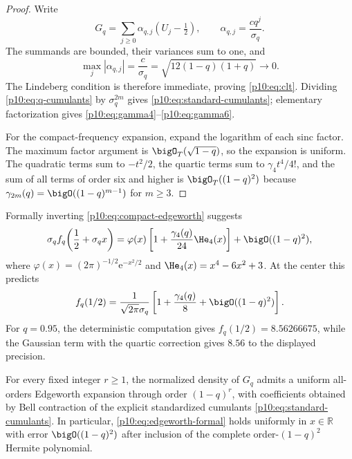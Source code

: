 \documentclass[11pt]{article}
\numberwithin{equation}{section}
\theoremstyle{definition}
\theoremstyle{remark}
\newcommand{\R}{\mathbb R}
\newcommand{\e}{\mathrm e}
\begin{document}
\begin{proof}
Write
\[
 G_q=\sum_{j\ge0}\alpha_{q,j}(U_j-\tfrac12),
 \qquad
 \alpha_{q,j}=\frac{cq^j}{\sigma_q}.
\]
The summands are bounded, their variances sum to one, and
\[
 \max_j|\alpha_{q,j}|=\frac{c}{\sigma_q}
 =\sqrt{12(1-q)(1+q)}\longrightarrow0.
\]
The Lindeberg condition is therefore immediate, proving \eqref{p10:eq:clt}.
Dividing \eqref{p10:eq:q-cumulants} by $\sigma_q^{2m}$ gives
\eqref{p10:eq:standard-cumulants}; elementary factorization gives
\eqref{p10:eq:gamma4}--\eqref{p10:eq:gamma6}.

For the compact-frequency expansion, expand the logarithm of each sinc factor.  The maximum
factor argument is $\bigO_T(\sqrt{1-q})$, so the expansion is uniform.  The quadratic terms
sum to $-t^2/2$, the quartic terms sum to $\gamma_4t^4/4!$, and the sum of all terms of order
six and higher is $\bigO_T((1-q)^2)$ because
$\gamma_{2m}(q)=\bigO((1-q)^{m-1})$ for $m\ge3$.
\end{proof}

Formally inverting \eqref{p10:eq:compact-edgeworth} suggests
\begin{equation}
 \sigma_q f_q\!\left(\frac12+\sigma_qx\right)
 =\varphi(x)\left[1+\frac{\gamma_4(q)}{24}\He_4(x)\right]
 +\bigO((1-q)^2),                                            \label{p10:eq:edgeworth-formal}
\end{equation}
where
\(
 \varphi(x)=(2\pi)^{-1/2}\e^{-x^2/2}
\)
and $\He_4(x)=x^4-6x^2+3$.
At the center this predicts
\begin{equation}
 f_q(1/2)
 =\frac{1}{\sqrt{2\pi}\sigma_q}
  \left[1+\frac{\gamma_4(q)}8+\bigO((1-q)^2)\right].        \label{p10:eq:center-edgeworth}
\end{equation}
For $q=0.95$, the deterministic computation gives $f_q(1/2)=8.56266675$, while the Gaussian
term with the quartic correction gives $8.56$ to the displayed precision.

\begin{conjecture}
\label{p10:conj:edgeworth}
For every fixed integer $r\ge1$, the normalized density of $G_q$ admits a uniform all-orders
Edgeworth expansion through order $(1-q)^r$, with coefficients obtained by Bell contraction
of the explicit standardized cumulants \eqref{p10:eq:standard-cumulants}.  In particular,
\eqref{p10:eq:edgeworth-formal} holds uniformly in $x\in\R$ with error
$\bigO((1-q)^2)$ after inclusion of the complete order-$(1-q)^2$ Hermite polynomial.
\end{conjecture}
\end{document}
